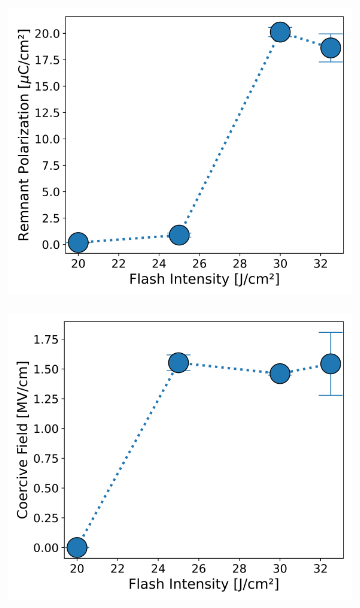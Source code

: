 \documentclass[11pt,twoside]{eitExjobb}
\begin{document}
\begin{figure}[htbp]
    \centering
    \begin{subfigure}{.4\linewidth}
        \includegraphics[width=\linewidth]{fig/FlashIntC_PrTrends.png}
        \caption{}\label{fig:res_IntCPr}
    \end{subfigure}
    \begin{subfigure}{.4\linewidth}
        \includegraphics[width=\linewidth]{fig/FlashIntC_EcTrends.png}
        \caption{}\label{fig:res_IntCEc}
    \end{subfigure}

\end{figure}
\end{document}
